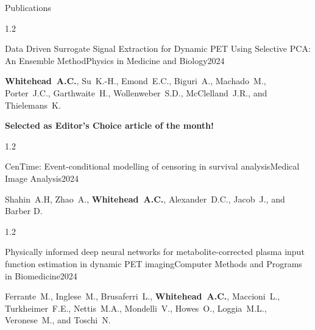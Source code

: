 \documentclass{cv}
\begin{document}
\begin{rSection}{Publications}
        \vspace{-0.5cm}
        \begin{spacing}{1.2}
            \item \begin{rSubsection}{Data Driven Surrogate Signal Extraction for Dynamic PET Using Selective PCA: An Ensemble Method}{}{Physics in Medicine and Biology}{2024}
                \vspace{-0.25cm}
                \item \textbf{Whitehead~A.C.}, Su~K.-H., Emond~E.C., Biguri~A., Machado~M., Porter~J.C., Garthwaite~H., Wollenweber~S.D., McClelland~J.R., and Thielemans~K. \\
                \vspace{-0.5cm}
                \item \textbf{Selected as Editor’s Choice article of the month!} \\
            \end{rSubsection}
        \end{spacing}

        \vspace{-0.5cm}
        \begin{spacing}{1.2}
            \item \begin{rSubsection}{CenTime: Event-conditional modelling of censoring in survival analysis}{}{Medical Image Analysis}{2024}
                \vspace{-0.25cm}
                \item Shahin~A.H, Zhao~A., \textbf{Whitehead~A.C.}, Alexander~D.C., Jacob~J., and Barber D.
            \end{rSubsection}
        \end{spacing}

        \vspace{-0.5cm}
        \begin{spacing}{1.2}
            \item \begin{rSubsection}{Physically informed deep neural networks for metabolite-corrected plasma input function estimation in dynamic PET imaging}{}{Computer Methods and Programs in Biomedicine}{2024}
                \vspace{-0.25cm}
                \item Ferrante~M., Inglese~M., Brusaferri~L., \textbf{Whitehead~A.C.}, Maccioni~L., Turkheimer~F.E., Nettis~M.A., Mondelli~V., Howes~O., Loggia~M.L., Veronese~M., and Toschi~N.
            \end{rSubsection}
        \end{spacing}


\end{rSection}
\end{document}
